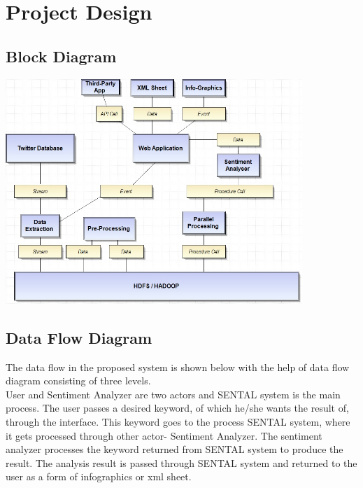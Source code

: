 \documentclass[a4paper,12pt]{report}
\begin{document}
\chapter {Project Design}
\section{Block Diagram}

\begin{center}
	\includegraphics[height=8.5cm]{images/Architecture.jpg}
\end{center}
\section{Data Flow Diagram}
The data flow in the proposed system is shown below with the help of data flow diagram consisting of three levels.\\
\hspace*{\parindent}User and Sentiment Analyzer are two actors and SENTAL system is the main process. The user passes a desired keyword, of which he/she wants the result of, through the interface. This keyword goes to the process SENTAL system, where it gets processed through other actor- Sentiment Analyzer. The sentiment analyzer processes the keyword returned from SENTAL system to produce the result. The analysis result is passed through SENTAL system and returned to the user as a form of infographics or xml sheet.
\end{document}
